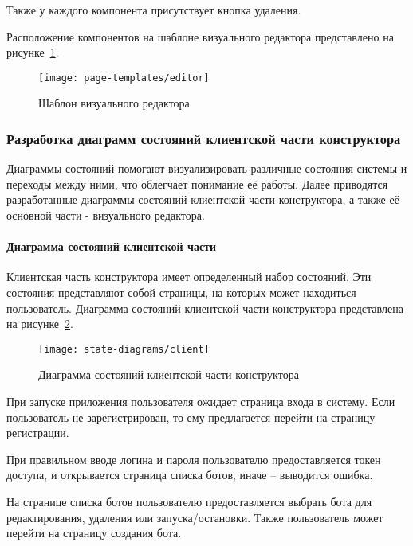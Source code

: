 Также у каждого компонента присутствует кнопка удаления.

Расположение компонентов на шаблоне визуального редактора
представлено на рисунке~\ref{f:editor-template}.

\begin{figure}[ht]
	\centering
	\vspace{\toppaddingoffigure}
	\texttt{[image: page-templates/editor]}
	\caption{Шаблон визуального редактора}
	\label{f:editor-template}
\end{figure}

\subsubsection{Разработка диаграмм состояний клиентской части конструктора}

Диаграммы состояний помогают визуализировать различные состояния системы и переходы между ними, что облегчает понимание её работы.
Далее приводятся разработанные диаграммы состояний клиентской части конструктора, а также
её основной части - визуального редактора.

\paragraph{Диаграмма состояний клиентской части}

Клиентская часть конструктора имеет определенный набор состояний.
Эти состояния представляют собой страницы, на которых может находиться пользователь.
Диаграмма состояний клиентской части конструктора представлена на
рисунке~\ref{f:client-state-diagram}.

\begin{figure}[ht]
	\centering
	\texttt{[image: state-diagrams/client]}
	\caption{Диаграмма состояний клиентской части конструктора}
	\label{f:client-state-diagram}
\end{figure}

При запуске приложения пользователя ожидает страница входа в
систему. Если пользователь не зарегистрирован, то ему предлагается перейти
на страницу регистрации.

При правильном вводе логина и пароля пользователю предоставляется
токен доступа, и открывается страница списка ботов, иначе – выводится
ошибка.

На странице списка ботов пользователю предоставляется выбрать бота
для редактирования, удаления или запуска/остановки. Также пользователь
может перейти на страницу создания бота.

